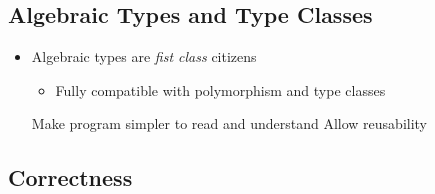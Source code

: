 \subsection{Algebraic Types and Type Classes}
\begin{itemize}
    \item Algebraic types are \textit{fist class} citizens
        \begin{itemize}
            \item Fully compatible with polymorphism and type classes
        \end{itemize}
    \ipro Make program simpler to read and understand
    \ipro Allow reusability
\end{itemize}

\subsection{Correctness}
